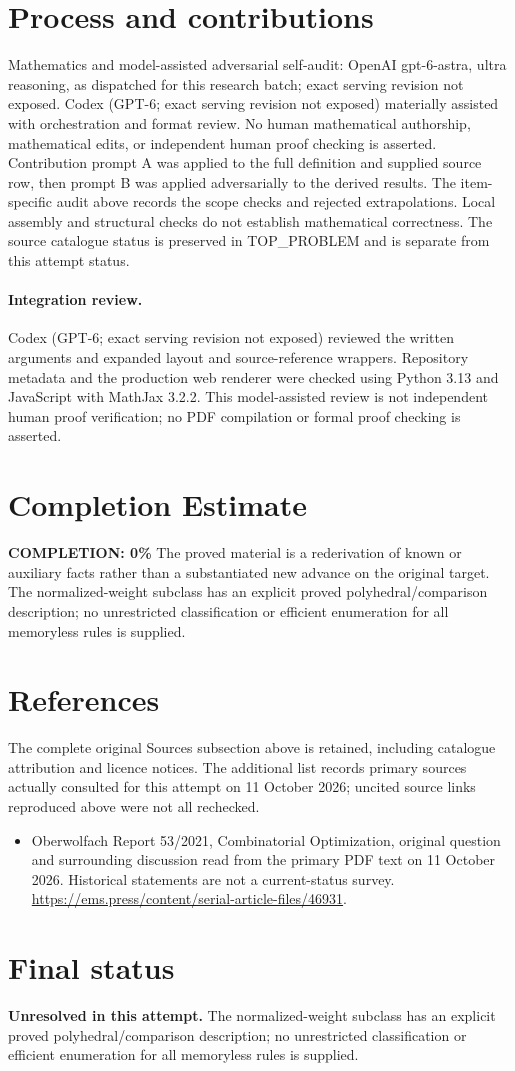 \documentclass[11pt]{article}
\begin{document}
\section{Process and contributions}
Mathematics and model-assisted adversarial self-audit: OpenAI gpt-6-astra, ultra reasoning, as dispatched for this research batch; exact serving revision not exposed. Codex (GPT-6; exact serving revision not exposed) materially assisted with orchestration and format review. No human mathematical authorship, mathematical edits, or independent human proof checking is asserted.
Contribution prompt A was applied to the full definition and supplied source row, then prompt B was applied adversarially to the derived results. The item-specific audit above records the scope checks and rejected extrapolations. Local assembly and structural checks do not establish mathematical correctness. The source catalogue status is preserved in TOP\_PROBLEM and is separate from this attempt status.
\paragraph{Integration review.} Codex (GPT-6; exact serving revision not exposed) reviewed the written arguments and expanded layout and source-reference wrappers. Repository metadata and the production web renderer were checked using Python 3.13 and JavaScript with MathJax 3.2.2. This model-assisted review is not independent human proof verification; no PDF compilation or formal proof checking is asserted.

\section{Completion Estimate}
\noindent\textbf{COMPLETION: 0\%}
The proved material is a rederivation of known or auxiliary facts rather than a substantiated new advance on the original target. The normalized-weight subclass has an explicit proved polyhedral/comparison description; no unrestricted classification or efficient enumeration for all memoryless rules is supplied.
\section{References}
The complete original Sources subsection above is retained, including catalogue attribution and licence notices. The additional list records primary sources actually consulted for this attempt on 11 October 2026; uncited source links reproduced above were not all rechecked.
\begin{itemize}
\item Oberwolfach Report 53/2021, Combinatorial Optimization, original question and surrounding discussion read from the primary PDF text on 11 October 2026. Historical statements are not a current-status survey. \url{https://ems.press/content/serial-article-files/46931}.
\end{itemize}
\section{Final status}
\textbf{Unresolved in this attempt.} The normalized-weight subclass has an explicit proved polyhedral/comparison description; no unrestricted classification or efficient enumeration for all memoryless rules is supplied.
\end{document}
